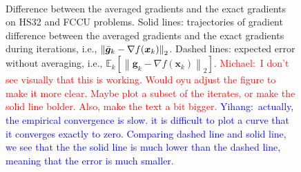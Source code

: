 \documentclass[aos]{imsart}
\numberwithin{equation}{section}
\theoremstyle{plain}
\newcommand{\michael}[1]{\textcolor{red}{Michael:\ #1}}
\newcommand{\yihang}[1]{\textcolor{blue}{Yihang:\ #1}}
\begin{document}
    \begin{figure}[h!]
\\
    \caption{		
	 Difference between the averaged gradients and the exact gradients on HS32 and FCCU problems. Solid lines: trajectories of gradient difference between the averaged gradients and the exact gradients during iterations, i.e., $\left\| \Bar{\bm{g}}_k -\nabla f(\bm{x}_k)\right\|_2$. Dashed lines: expected error without averaging, i.e., $\mathbb{E}_k \left[\left\| \bm{g}_k -\nabla f(\bm{x}_k)\right\|_2 \right]$.
\michael{I don't see visually that this is working. Would oyu adjust the figure to make it more clear.  Maybe plot a subset of the iterates, or make the solid line bolder. Also, make the text a bit bigger.}
\yihang{actually, the empirical convergence is slow. it is difficult to plot a curve that it converges exactly to zero. Comparing dashed line and solid line, we see that the the solid line is much lower than the dashed line, meaning that the error is much smaller.}
}	
    \label{fig:avg_grad}
\end{figure} 
\end{document}
